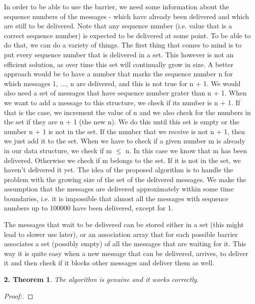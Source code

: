 \documentclass[12pt]{article}
\theoremstyle{plain}
\begin{document}
In order to be able to use the barrier, we need some information about the 
sequence numbers of the messages - which have already been delivered and which
are still to be delivered. Note that any sequence number (i.e. value that is a
correct sequence number) is expected to be delivered at some point. To be able
to do that, we can do a variety of things. The first thing that comes to mind 
is to put every sequence number that is delivered in a set. This however is not
an efficient solution, as over time this set will continually grow in size.
A better approach would be to have a number that marks the sequence number n
for which messages 1, $\dots$, n are delivered, and this is not true for n + 1.
We would also need a set of messages that have sequence number grater than 
n + 1. When we want to add a message to this structure, we check if its number
is n + 1. If that is the case, we increment the value of n and we also check
for the numbers in the set if they are n + 1 (the new n). We do this until
this set is empty or the number n + 1 is not in the set. 
If the number that we receive is not n + 1, then we just add it to the set.
When we have to check if a given number m is already in our data structure,
we check if m $\le$ n. In this case we know that m has been delivered. Otherwise
we check if m belongs to the set. If it is not in the set, we haven't delivered
it yet.
The idea of the proposed algorithm is to handle the problem with the growing
size of the set of the delivered messages. We make the assumption that the
messages are delivered approximately within some time boundaries, i.e. it is
impossible that almost all the messages with sequence numbers up to 100000
have been delivered, except for 1.

The messages that wait to be delivered can be stored either in a set (this
might lead to slower use later), or an association array that for each possible
barrier associates a set (possibly empty) of all the messages that are waiting
for it. This way it is quite easy when a new message that can be delivered,
arrives, to deliver it and then check if it blocks other messages and 
deliver them as well.

\newtheorem*{th1}{2.  Theorem}
\begin{th1}
  The algorithm is genuine and it works correctly.
\end{th1}
\begin{proof}[Proof:]
  
\end{proof}

  
\end{document}
